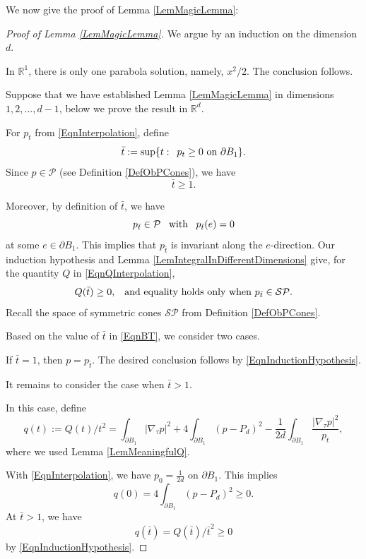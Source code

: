 \documentclass{amsart}
\def\R {\mathbb{R}}
\def\PB{\partial B_1}
\def\P{\mathcal{P}}
\def\SP{\mathcal{SP}}
\def\hem{\hspace{0.5em}}
\def\vem{\vspace{0.6em}}
\theoremstyle{definition}
\numberwithin{equation}{section}
\theoremstyle{remark}
\begin{document}
We now give the proof of Lemma \ref{LemMagicLemma}:
\begin{proof}[Proof of Lemma \ref{LemMagicLemma}]
We argue by an induction on the dimension $d$. 

In $\R^1$, there is only one parabola solution, namely, $x^2/2$. The conclusion follows. 

Suppose that we have established Lemma \ref{LemMagicLemma} in dimensions $1,2,\dots, d-1$, below we prove the result in $\R^d$. 

\vem

For $p_t$ from \eqref{EqnInterpolation}, define 
\begin{equation}
\label{EqnBT}
\bar{t}:=\sup\{t:\hem p_t\ge0 \text{ on }\PB\}.
\end{equation}  
Since  $p\in\P$ (see Definition \ref{DefObPCones}), we have $$\bar{t}\ge1.$$ 

Moreover, by definition of $\bar{t}$, we have
$$
p_{\bar t}\in\P \hem \text{ with }\hem p_{\bar t}(e)=0 
$$
at some $e\in\PB$. This implies that $p_{\bar t}$ is invariant along the $e$-direction. Our induction hypothesis and   Lemma \ref{LemIntegralInDifferentDimensions} give, for the quantity $Q$ in \eqref{EqnQInterpolation},
\begin{equation}
\label{EqnInductionHypothesis}
Q(\bar t)\ge 0, \hem\text{ and equality holds only when }p_{\bar t}\in\SP.
\end{equation} 
Recall the space of symmetric cones $\SP$ from Definition \ref{DefObPCones}. 

\vem
Based on the value of $\bar t$ in \eqref{EqnBT}, we consider two cases.

If $\bar{t}=1$, then $p=p_{\bar t}$. The desired conclusion follows by \eqref{EqnInductionHypothesis}.  

It remains to consider the case when $\bar{t}>1$.

In this case, define
\begin{equation}
\label{Eqnq}
q(t):=Q(t)/t^2=\int_{\partial B_1}|\nabla_\tau p|^2+4\int_{\partial B_1}(p-P_d)^2-\frac{1}{2d}\int_{\partial B_1}\frac{|\nabla_\tau p|^2}{p_t},
\end{equation}
where we used Lemma \ref{LemMeaningfulQ}. 

With \eqref{EqnInterpolation}, we have $p_0=\frac{1}{2d}$ on $\PB$. This implies
\begin{equation}
\label{Eqnq0}
q(0)=4\int_{\partial B_1}(p-P_d)^2\ge0.
\end{equation}
At $\bar t>1$, we have
\begin{equation}
\label{Eqnqbt}
q(\bar t)=Q(\bar t)/\bar{t}^2\ge0
\end{equation}
by \eqref{EqnInductionHypothesis}.


\end{proof}
\end{document}
